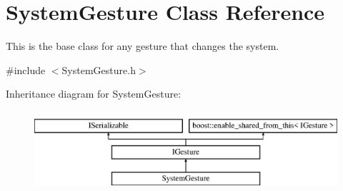 \hypertarget{class_system_gesture}{}\section{System\+Gesture Class Reference}
\label{class_system_gesture}


This is the base class for any gesture that changes the system.  




{\ttfamily \#include $<$System\+Gesture.\+h$>$}

Inheritance diagram for System\+Gesture\+:\begin{figure}[H]
\begin{center}
\leavevmode
\includegraphics[height=3.000000cm]{class_system_gesture}
\end{center}
\end{figure}
